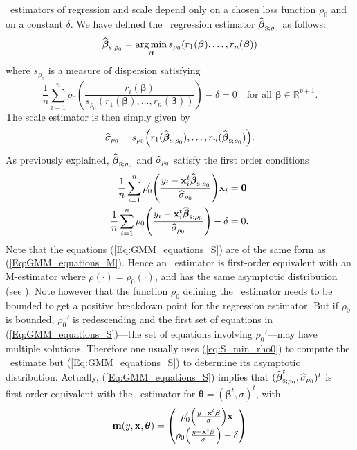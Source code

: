 ~estimators of regression and scale depend only on a chosen loss function
$\rho_0$ and on a constant $\delta$. We have defined the ~regression
estimator $\sthat{\boldsymbol\beta}_{\stsc{S};\rho_0}$ as follows:
%
\begin{equation}
    \label{eq:S_min_rho0}
    \sthat{\boldsymbol\beta}_{\stsc{S};\rho_0} = \argmin_{\boldsymbol\beta} 
    s_{\rho_0}(r_1(\boldsymbol\beta), \dots, r_n(\boldsymbol\beta))
\end{equation}
%
where $s_{\rho_0}$ is a measure of dispersion satisfying
\[
    \frac{1}{n} \sum_{i=1}^{n} 
    \rho_0\left(\frac{r_i(\boldsymbol\beta)}{s_{\rho_0}(r_1(\boldsymbol\beta), 
        \dots, r_n(\boldsymbol\beta))}\right)
    - \delta =0 
    \quad\text{for all $\boldsymbol\beta \in \mathbb{R}^{p+1}$}.
\]
The scale estimator is then simply given by
\[
    \sthat{\sigma}_{\rho_0} = 
    s_{\rho_0}\left(r_1(\sthat{\boldsymbol\beta}_{\stsc{S};\rho_0}), \dots,
    r_n(\sthat{\boldsymbol\beta}_{\stsc{S};\rho_0})\right).
\]
As previously explained, $\sthat{\boldsymbol\beta}_{\stsc{S};\rho_0}$
and $\widehat{\sigma}_{\rho_0}$ satisfy the first order conditions
%
\begin{equation}
    \label{Eq:GMM_equations_S}
    \begin{aligned}
        \frac{1}{n} \sum_{i=1}^{n}
            \rho_0'\left(\frac{y_i-\stvec{x}_i^t\sthat{\boldsymbol\beta}_{\stsc{S};\rho_0}}
            {\sthat{\sigma}_{\rho_0}}\right) \stvec{x}_i 
        & = \stvec{0}
        \\
        \frac{1}{n} \sum_{i=1}^{n}
            \rho_0\left(\frac{y_i-\stvec{x}_i^t\sthat{\boldsymbol\beta}_{\stsc{S};\rho_0}}
            {\sthat{\sigma}_{\rho_0}}\right) - \delta 
        & = 0.
    \end{aligned}
\end{equation}
%
Note that the equations (\ref{Eq:GMM_equations_S}) are of the same form as
(\ref{Eq:GMM_equations_M}). Hence an ~estimator is first-order
equivalent with an M-estimator where $\rho(\cdot) =\rho_0(\cdot)$, and has the
same asymptotic distribution (see \citealp{rousseeuw:yohai:1984}). Note however
that the function $\rho_0$ defining the ~estimator needs to be bounded
to get a positive breakdown point for the regression estimator. But if $\rho_0$
is bounded, $\rho_0'$ is redescending and the first set of equations in
(\ref{Eq:GMM_equations_S})---the set of equations involving $\rho_0'$---may
have multiple solutions. Therefore one usually uses (\ref{eq:S_min_rho0}) to
compute the ~estimate but (\ref{Eq:GMM_equations_S}) to determine its
asymptotic distribution. Actually, (\ref{Eq:GMM_equations_S}) implies that
$(\sthat{\boldsymbol\beta}_{\stsc{S};\rho_0}^t,\sthat{\sigma}_{\rho_0})^t$
 is first-order equivalent with the ~estimator for $\boldsymbol\theta
= (\boldsymbol\beta^t,\sigma)^t$,
with
\[
    \stvec{m}(y,\stvec{x},\boldsymbol\theta) = 
    \begin{pmatrix}
        \rho_0'\left(\frac{y-\stvec{x}^t\boldsymbol\beta}{\sigma}\right) \stvec{x}
        \\[1ex]
        \rho_0\left(\frac{y-\stvec{x}^t\boldsymbol\beta}{\sigma}\right) - \delta
    \end{pmatrix}
\]


